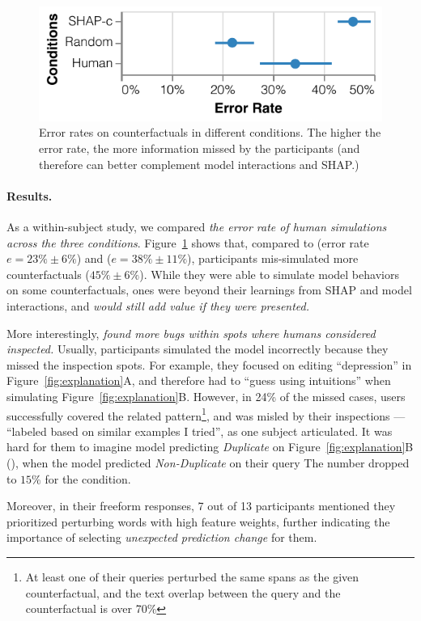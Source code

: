 \begin{figure}[t]
\centering
\includegraphics[width=1\columnwidth]{figures/err_rate}
\vspace{-15pt}
\caption{
Error rates on counterfactuals in different conditions. The higher the error rate, the more information missed by the participants (\ie and therefore can better complement model interactions and SHAP.)
}
\vspace{-10pt}
\label{fig:err_rate}
\end{figure}

\paragraph{Results.}
As a within-subject study, we compared \emph{the error rate of human simulations across the three conditions}.
Figure~\ref{fig:err_rate} shows that, compared to \crandom (error rate $e=23\%\pm6\%$) and \chuman ($e=38\%\pm11\%$), participants mis-simulated more \cshap counterfactuals ($45\%\pm 6\%$).
While they were able to simulate model behaviors on some counterfactuals, \cshap ones were beyond their learnings from SHAP and model interactions, and \emph{would still add value if they were presented.}


More interestingly, \emph{\cshap found more bugs within spots where humans considered inspected.}
Usually, participants simulated the model incorrectly because they missed the inspection spots.
For example, they focused on editing ``depression'' in Figure~\ref{fig:explanation}A, and therefore had to ``guess using intuitions'' when simulating Figure~\ref{fig:explanation}B.
However, in 24\% of the missed \cshap cases, users successfully covered the related pattern\footnote{At least one of their queries perturbed the same spans as the given counterfactual, and the text overlap between the query and the counterfactual is over 70\%}, and was misled by their inspections --- ``labeled based on similar examples I tried'', as one subject articulated.
It was hard for them to imagine model predicting \emph{Duplicate} on Figure~\ref{fig:explanation}B (), when the model predicted \emph{Non-Duplicate} on their query 
The number dropped to $15\%$ for the \chuman condition.


Moreover, in their freeform responses, 7 out of 13 participants mentioned they prioritized perturbing words with high feature weights, further indicating the importance of selecting \emph{unexpected prediction change} for them.


